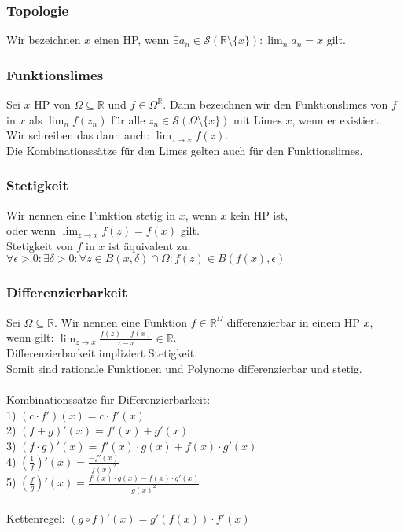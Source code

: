 \documentclass{article}
\begin{document}
\subsubsection*{Topologie}
Wir bezeichnen \(x\) einen HP, wenn \(\exists a_n \in \mathcal{S}(\mathbb{R} \setminus \{x\}): \lim_{n} a_n = x\) gilt.
\subsubsection*{Funktionslimes}
Sei \(x\) HP von \(\Omega \subseteq \mathbb R\) und \(f \in \Omega ^ \mathbb R\). Dann bezeichnen wir den Funktionslimes von \(f\) in \(x\) als \(\lim_{n} f(z_n)\) für alle \(z_n \in \mathcal S (\Omega \setminus \{x\})\) mit Limes \(x\), wenn er existiert. \\
Wir schreiben das dann auch: \(\lim_{z \rightarrow x} f(z)\). \\
Die Kombinationssätze für den Limes gelten auch für den Funktionslimes.
\subsubsection*{Stetigkeit}
Wir nennen eine Funktion stetig in \(x\), wenn \(x\) kein HP ist,\\
oder wenn \(\lim_{z \rightarrow x}f(z) = f(x)\) gilt. \\
Stetigkeit von \(f\) in \(x\) ist äquivalent zu:\\
\(\forall \epsilon > 0: \exists \delta > 0: \forall z \in B(x, \delta) \cap \Omega: f(z) \in B(f(x), \epsilon)\)
\subsubsection*{Differenzierbarkeit}
Sei \(\Omega \subseteq \mathbb R\). Wir nennen eine Funktion \(f \in \mathbb R^\Omega\) differenzierbar in einem HP \(x\),\\
wenn gilt: \(\lim_{z\rightarrow x}\frac{f(z) - f(x)}{z - x} \in \mathbb R\). \\
Differenzierbarkeit impliziert Stetigkeit. \\
Somit sind rationale Funktionen und Polynome differenzierbar und stetig. \\ \\
Kombinationssätze für Differenzierbarkeit: \\
1) \((c\cdot f')(x) = c\cdot f'(x)\) \\
2) \((f + g)'(x) = f'(x) + g'(x)\) \\
3) \((f\cdot g)'(x) = f'(x)\cdot g(x) + f(x)\cdot g'(x)\) \\
4) \(\left(\frac{1}{f}\right)'(x) = \frac{-f'(x)}{f(x)^2}\) \\
5) \(\left(\frac{f}{g}\right)'(x) = \frac{f'(x)\cdot g(x) - f(x) \cdot g'(x)}{g(x)^2}\) \\ \\
Kettenregel: \((g \circ f)'(x) = g'(f(x))\cdot f'(x)\)
\end{document}
